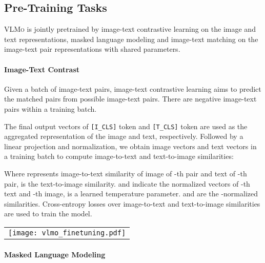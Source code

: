 \documentclass{article}
\newcommand{\sptk}[1]{\texttt{[#1]}}
\newcommand\our{\textsc{VLMo}}
\begin{document}
\subsection{Pre-Training Tasks}

\our{} is jointly pretrained by image-text contrastive learning on the image and text representations, masked language modeling and image-text matching on the image-text pair representations with shared parameters. 

\paragraph{Image-Text Contrast}

Given a batch of  image-text pairs, image-text contrastive learning aims to predict the matched pairs from  possible image-text pairs.
There are  negative image-text pairs within a training batch.

The final output vectors of \sptk{I\_CLS} token and \sptk{T\_CLS} token are used as the aggregated representation of the image and text, respectively.
Followed by a linear projection and normalization, we obtain image vectors  and text vectors  in a training batch to compute image-to-text and text-to-image similarities:


Where  represents image-to-text similarity of image of -th pair and text of -th pair,
 is the text-to-image similarity.
 and  indicate the normalized vectors of -th text and -th image,
 is a learned temperature parameter.
 and  are the -normalized similarities.
Cross-entropy losses over image-to-text and text-to-image similarities are used to train the model.  

\begin{figure*}[t]
\begin{center}
\begin{tabular}{c}
\texttt{[image: vlmo\_finetuning.pdf]}
\end{tabular}
\end{center}
\caption{
Fine-tuning \our{} on vision-language retrieval and classification tasks.
The model can be fine-tuned as a dual encoder to separately encode image and text for retrieval tasks.
\our{} can also be used as a fusion encoder to handle interaction of image-text pairs for classification tasks.
}
\label{fig:vlmo_finetuning}
\end{figure*}

\paragraph{Masked Language Modeling}
\end{document}
